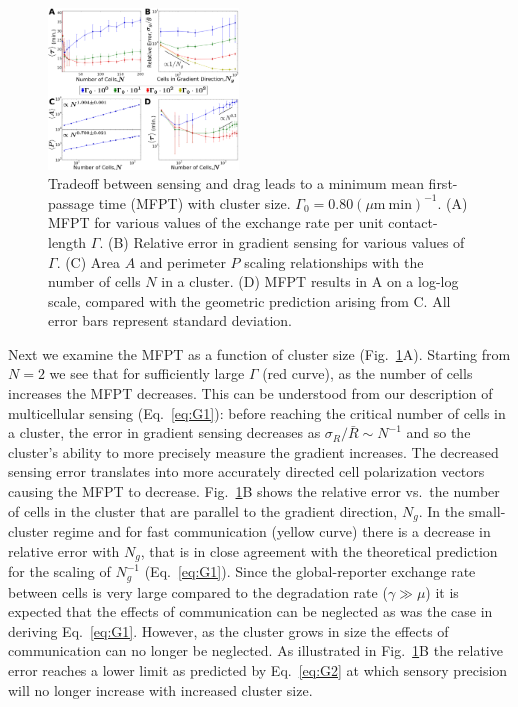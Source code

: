\begin{figure}[ht]
    \centering
        \includegraphics[width=0.45\textwidth]{../fig/ch2_fig3.png}
    \caption{Tradeoff between sensing and drag leads to a minimum mean first-passage time (MFPT) with cluster size. $\Gamma_0 = 0.80 (\mu\text{m} \ \text{min})^{-1}$. (A) MFPT for various values of the exchange rate per unit contact-length $\Gamma$. (B) Relative error in gradient sensing for various values of $\Gamma$. (C) Area $A$ and perimeter $P$ scaling relationships with the number of cells $N$ in a cluster. (D) MFPT results in A on a log-log scale, compared with the geometric prediction arising from C. All error bars represent standard deviation.} \label{fig:results}
\end{figure}


Next we examine the MFPT as a function of cluster size (Fig.\ \ref{fig:results}A). Starting from $N=2$ we see that for sufficiently large $\Gamma$ (red curve), as the number of cells increases the MFPT decreases. This can be understood from our description of multicellular sensing (Eq.\ \ref{eq:G1}): before reaching the critical number of cells in a cluster, the error in gradient sensing decreases as $\sigma_R/\bar{R} \sim N^{-1}$ and so the cluster's ability to more precisely measure the gradient increases. The decreased sensing error translates into more accurately directed cell polarization vectors causing the MFPT to decrease. Fig.\ \ref{fig:results}B shows the relative error vs.\ the number of cells in the cluster that are parallel to the gradient direction, $N_g$. In the small-cluster regime and for fast communication (yellow curve) there is a decrease in relative error with $N_g$, that is in close agreement with the theoretical prediction for the scaling of $N_g^{-1}$
(Eq.\ \ref{eq:G1}). Since the global-reporter exchange rate between cells is very large compared to the degradation rate
($\gamma\gg\mu$)
it is expected that the effects of communication can be neglected as was the case in deriving Eq.\ \ref{eq:G1}. However, as the cluster grows in size the effects of communication can no longer be neglected. As illustrated in Fig.\ \ref{fig:results}B the relative error reaches a lower limit as predicted by Eq.\ \ref{eq:G2} at which sensory precision will no longer increase with increased cluster size.

